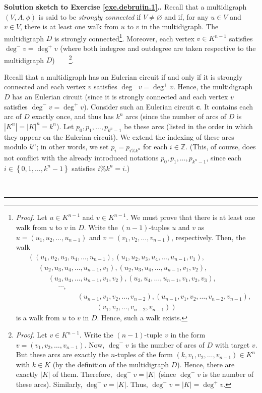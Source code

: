 \documentclass[numbers=enddot,12pt,final,onecolumn,notitlepage]{scrartcl}%
\theoremstyle{definition}
\newenvironment{proof}[1][Proof]{\noindent\textbf{#1.} }{\ \rule{0.5em}{0.5em}}
\newcommand{\ZZ}{\mathbb{Z}}
\newcommand{\set}[1]{\left\{ #1 \right\}}
\newcommand{\abs}[1]{\left| #1 \right|}
\newcommand{\tup}[1]{\left( #1 \right)}
\begin{document}
\begin{proof}[Solution sketch to Exercise \ref{exe.debruijn.1}.]
Recall that a multidigraph $\tup{V, A, \phi}$ is said to be
\textit{strongly connected} if $V \neq \varnothing$ and if, for any
$u \in V$ and $v \in V$, there is at least one walk from $u$ to $v$
in the multidigraph.
The multidigraph $D$ is strongly connected\footnote{\textit{Proof.}
Let $u \in K^{n-1}$ and $v \in K^{n-1}$. We must prove that there is
at least one walk from $u$ to $v$ in $D$. Write the $\tup{n-1}$-tuples
$u$ and $v$ as $u = \tup{u_1, u_2, \ldots, u_{n-1}}$ and
$v = \tup{v_1, v_2, \ldots, v_{n-1}}$, respectively.
Then, the walk
\begin{align*}
& \left( \tup{u_1, u_2, u_3, u_4, \ldots, u_{n-1}} , \tup{u_1, u_2, u_3, u_4, \ldots, u_{n-1}, v_1} , \right. \\
& \left. \phantom{u_1, } \tup{u_2, u_3, u_4, \ldots, u_{n-1}, v_1} , \tup{u_2, u_3, u_4, \ldots, u_{n-1}, v_1, v_2} , \right. \\
& \left. \phantom{u_1, u_2, } \tup{u_3, u_4, \ldots, u_{n-1}, v_1, v_2} , \tup{u_3, u_4, \ldots, u_{n-1}, v_1, v_2, v_3} , \right. \\
& \left. \phantom{u_1, u_2, u_3, } \cdots , \right. \\
& \left. \phantom{u_1, u_2, u_3, u_4, \ldots, } \tup{u_{n-1}, v_1, v_2, \ldots, v_{n-2}} , \tup{u_{n-1}, v_1, v_2, \ldots, v_{n-2}, v_{n-1}} , \right. \\
& \left. \phantom{u_1, u_2, u_3, u_4, \ldots, u_{n-1}, } \tup{v_1, v_2, \ldots, v_{n-2}, v_{n-1}} \right)
\end{align*}
is a walk from $u$ to $v$ in $D$. Hence, such a walk exists.}.
Moreover, each vertex $v \in K^{n-1}$ satisfies
$\deg^- v = \deg^+ v$ (where both indegree and outdegree are taken
respective to the multidigraph $D$)\ \ \ \ \footnote{\textit{Proof.}
Let $v \in K^{n-1}$. Write the $\tup{n-1}$-tuple $v$ in the form
$v = \tup{v_1, v_2, \ldots, v_{n-1}}$.
Now, $\deg^- v$ is the number of arcs of $D$
with target $v$. But these arcs are exactly the $n$-tuples of the
form $\tup{k, v_1, v_2, \ldots, v_{n-1}} \in K^n$ with $k \in K$
(by the definition of the multidigraph $D$). Hence, there are
exactly $\abs{K}$ of them. Therefore, $\deg^- v = \abs{K}$ (since
$\deg^- v$ is the number of these arcs). Similarly,
$\deg^+ v = \abs{K}$. Thus, $\deg^- v = \abs{K} = \deg^+ v$.}.

Recall that a multidigraph has an Eulerian circuit if and only if it
is strongly connected and each vertex $v$ satisfies
$\deg^- v = \deg^+ v$. Hence, the multidigraph $D$ has an Eulerian
circuit (since it is strongly connected and each vertex $v$ satisfies
$\deg^- v = \deg^+ v$). Consider such an Eulerian circuit
$\mathbf{c}$. It contains
each arc of $D$ exactly once, and thus has $k^n$ arcs (since
the number of arcs of $D$ is $\abs{K^n} = \abs{K}^n = k^n$).
Let $p_0, p_1, \ldots, p_{k^n-1}$ be these arcs (listed in the order
in which they appear on the Eulerian circuit). We extend the
indexing of these arcs modulo $k^n$; in other words, we set
$p_i = p_{i \% k^n}$ for each $i \in \ZZ$. (This, of course, does not
conflict with the already introduced notations 
$p_0, p_1, \ldots, p_{k^n-1}$, since each
$i \in \set{0, 1, \ldots, k^n-1}$ satisfies $i \% k^n = i$.)


\end{proof}
\end{document}
